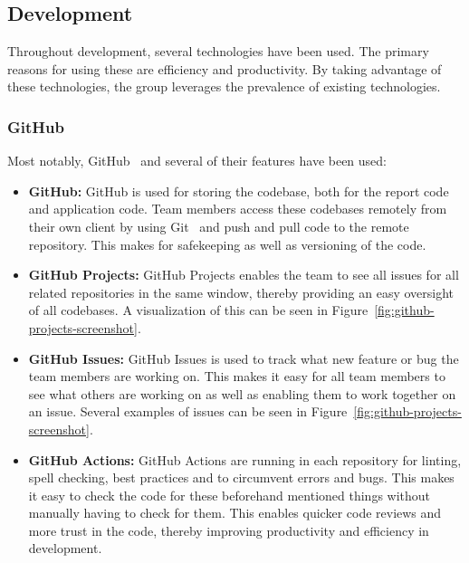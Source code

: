 \subsection{Development}\label{subsec:development}

Throughout development, several technologies have been used.
The primary reasons for using these are efficiency and productivity.
By taking advantage of these technologies, the group leverages the prevalence of existing technologies.

\subsubsection{GitHub}

Most notably, GitHub~\cite{github2024} and several of their features have been used:

\begin{itemize}
    \item \textbf{GitHub:}
    GitHub is used for storing the codebase, both for the report code and application code.
    Team members access these codebases remotely from their own client by using Git~\cite{git2024} and push and pull
    code to the remote repository.
    This makes for safekeeping as well as versioning of the code.

    \item \textbf{GitHub Projects:}
    GitHub Projects enables the team to see all issues for all related repositories in the same window, thereby
    providing an easy oversight of all codebases.
    A visualization of this can be seen in Figure~\ref{fig:github-projects-screenshot}.

    \item \textbf{GitHub Issues:}
    GitHub Issues is used to track what new feature or bug the team members are working on.
    This makes it easy for all team members to see what others are working on as well as enabling them to work together
    on an issue.
    Several examples of issues can be seen in Figure~\ref{fig:github-projects-screenshot}.

    \item \textbf{GitHub Actions:}
    GitHub Actions are running in each repository for linting, spell checking, best practices and to
    circumvent errors and bugs.
    This makes it easy to check the code for these beforehand mentioned things without manually having to check for
    them.
    This enables quicker code reviews and more trust in the code, thereby improving productivity and efficiency in
    development.
\end{itemize}

